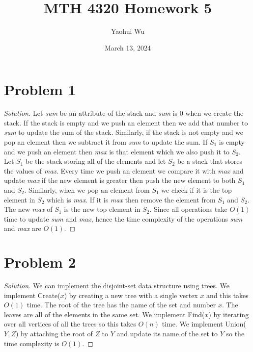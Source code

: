 \documentclass[12pt]{article}
\title{MTH 4320 Homework 5}
\author{Yaohui Wu}
\date{March 13, 2024}
\newenvironment*{solution}{\begin{proof}[Solution]}{\end{proof}}
\begin{document}
\maketitle
\section*{Problem 1}
\begin{solution}
    Let \textit{sum} be an attribute of the stack and \textit{sum} is 0 when
    we create the stack. If the stack is empty and we push an element then we
    add that number to \textit{sum} to update the sum of the stack. Similarly,
    if the stack is not empty and we pop an element then we subtract it from
    \textit{sum} to update the sum. If \(S_1\) is empty and we push an element
    then \textit{max} is that element which we also push it to \(S_2\). Let \(
    S_1\) be the stack storing all of the elements and let \(S_2\) be a stack
    that stores the values of \textit{max}. Every time we push an element we
    compare it with \textit{max} and update \textit{max} if the new element is
    greater then push the new element to both \(S_1\) and \(S_2\). Similarly,
    when we pop an element from \(S_1\) we check if it is the top element in
    \(S_2\) which is \textit{max}. If it is \textit{max} then remove the
    element from \(S_1\) and \(S_2\). The new \textit{max} of \(S_1\) is the
    new top element in \(S_2\). Since all operations take \(O(1)\) time to
    update \textit{sum} and \textit{max}, hence the time complexity of the
    operations \textit{sum} and \textit{max} are \(O(1)\).
\end{solution}
\section*{Problem 2}
\begin{solution}
    We can implement the disjoint-set data structure using trees. We implement
    Create(\(x\)) by creating a new tree with a single vertex \(x\) and this
    takes \(O(1)\) time. The root of the tree has the name of the set and
    number \(x\). The leaves are all of the elements in the same set. We
    implement Find(\(x\)) by iterating over all vertices of all the trees so
    this takes \(O(n)\) time. We implement Union(\(Y, Z\)) by attaching the
    root of \(Z\) to \(Y\) and update its name of the set to \(Y\) so the time
    complexity is \(O(1)\).
\end{solution}
\end{document}
